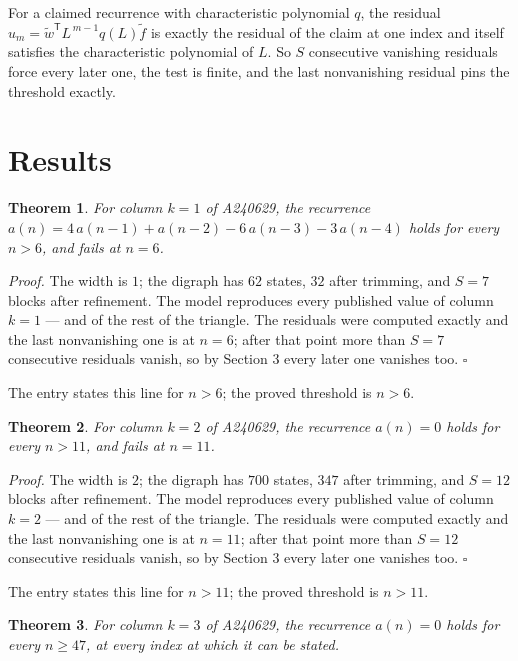 \documentclass[11pt]{article}
\newtheorem{theorem}{Theorem}
\theoremstyle{definition}
\begin{document}
For a claimed recurrence with characteristic polynomial $q$, the residual $u_m = \tilde w^{\mathsf T}L^{\,m-1}q(L)\tilde f$ is exactly the residual of the claim at one index and itself satisfies the characteristic polynomial of $L$. So $S$ consecutive vanishing residuals force every later one, the test is finite, and the last nonvanishing residual pins the threshold exactly.

\section{Results}

\begin{theorem} For column $k = 1$ of A240629, the recurrence $a(n) = 4\,a(n-1) + a(n-2) - 6\,a(n-3) - 3\,a(n-4)$ holds for every $n > 6$, and fails at $n = 6$.\end{theorem}

{\itshape Proof.} The width is $1$; the digraph has $62$ states, $32$ after trimming, and $S = 7$ blocks after refinement. The model reproduces every published value of column $k = 1$ --- and of the rest of the triangle. The residuals were computed exactly and the last nonvanishing one is at $n = 6$; after that point more than $S = 7$ consecutive residuals vanish, so by Section 3 every later one vanishes too. $\square$

The entry states this line for $n > 6$; the proved threshold is $n > 6$.

\begin{theorem} For column $k = 2$ of A240629, the recurrence $a(n) = 0$ holds for every $n > 11$, and fails at $n = 11$.\end{theorem}

{\itshape Proof.} The width is $2$; the digraph has $700$ states, $347$ after trimming, and $S = 12$ blocks after refinement. The model reproduces every published value of column $k = 2$ --- and of the rest of the triangle. The residuals were computed exactly and the last nonvanishing one is at $n = 11$; after that point more than $S = 12$ consecutive residuals vanish, so by Section 3 every later one vanishes too. $\square$

The entry states this line for $n > 11$; the proved threshold is $n > 11$.

\begin{theorem} For column $k = 3$ of A240629, the recurrence $a(n) = 0$ holds for every $n \ge 47$, at every index at which it can be stated.\end{theorem}
\end{document}
